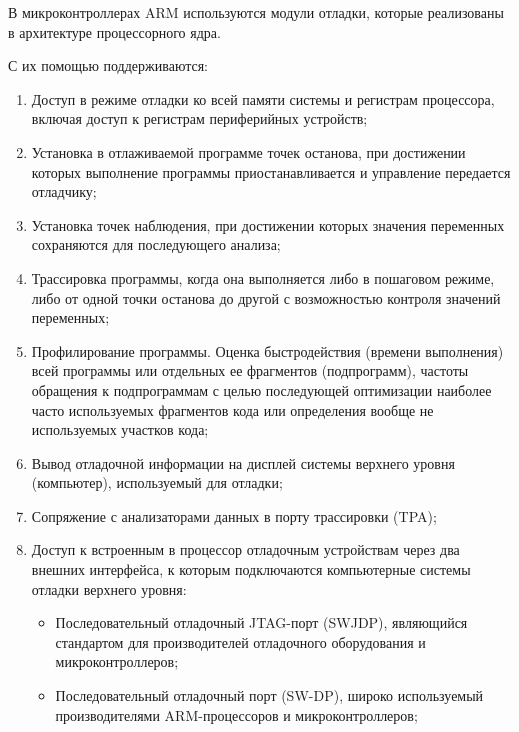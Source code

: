 \documentclass[12pt, oneside]{altsu-report}
\begin{document}
В микроконтроллерах ARM используются модули отладки, которые реализованы в архитектуре процессорного ядра.

С их помощью поддерживаются:

\begin{enumerate}
    \item Доступ в режиме отладки ко всей памяти системы и регистрам процессора, включая доступ к регистрам периферийных устройств;

    \item Установка в отлаживаемой программе точек останова, при достижении которых выполнение программы приостанавливается и управление передается отладчику;

    \item Установка точек наблюдения, при достижении которых значения переменных сохраняются для последующего анализа;
    
    \item Трассировка программы, когда она выполняется либо в пошаговом режиме, либо от одной точки останова до другой с возможностью контроля значений переменных;

    \item Профилирование программы. Оценка быстродействия (времени выполнения) всей программы или отдельных ее фрагментов (подпрограмм), частоты обращения к подпрограммам с целью последующей оптимизации наиболее часто используемых фрагментов кода или определения вообще не используемых участков кода;

    \item Вывод отладочной информации на дисплей системы верхнего уровня (компьютер), используемый для отладки;

    \item Сопряжение с анализаторами данных в порту трассировки (TPA);

    \item Доступ к встроенным в процессор отладочным устройствам через два внешних интерфейса, к которым подключаются компьютерные системы отладки верхнего уровня:

    \begin{itemize}
        \item Последовательный отладочный JTAG-порт (SWJDP), являющийся стандартом для производителей отладочного оборудования и микроконтроллеров;
    
        \item Последовательный отладочный порт (SW-DP), широко используемый производителями ARM-процессоров и микроконтроллеров;
    \end{itemize}
\end{enumerate}
\end{document}

